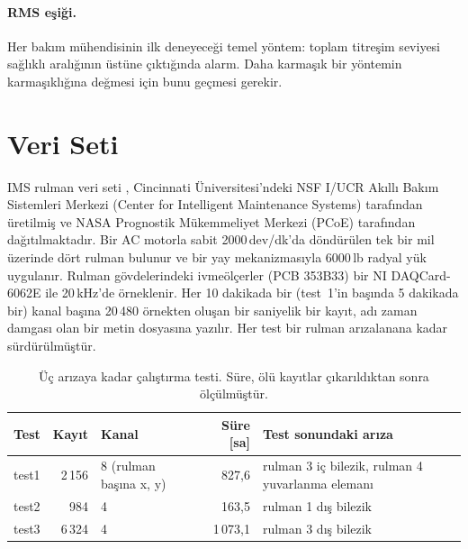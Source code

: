 \documentclass[11pt]{article}
\begin{document}
\paragraph{RMS eşiği.} Her bakım mühendisinin ilk deneyeceği temel yöntem: toplam titreşim seviyesi
sağlıklı aralığının üstüne çıktığında alarm. Daha karmaşık bir yöntemin karmaşıklığına değmesi için
bunu geçmesi gerekir.

\section{Veri Seti}

IMS rulman veri seti \cite{lee2007,qiu2006}, Cincinnati Üniversitesi'ndeki NSF I/UCR Akıllı Bakım
Sistemleri Merkezi (Center for Intelligent Maintenance Systems) tarafından üretilmiş ve NASA Prognostik
Mükemmeliyet Merkezi (PCoE) tarafından dağıtılmaktadır. Bir AC motorla sabit 2000\,dev/dk'da döndürülen
tek bir mil üzerinde dört rulman bulunur ve bir yay mekanizmasıyla 6000\,lb radyal yük uygulanır. Rulman
gövdelerindeki ivmeölçerler (PCB 353B33) bir NI DAQCard-6062E ile 20\,kHz'de örneklenir. Her 10 dakikada
bir (test~1'in başında 5 dakikada bir) kanal başına 20\,480 örnekten oluşan bir saniyelik bir kayıt, adı
zaman damgası olan bir metin dosyasına yazılır. Her test bir rulman arızalanana kadar sürdürülmüştür.

\begin{table}[H]
\centering
\caption{Üç arızaya kadar çalıştırma testi. Süre, ölü kayıtlar çıkarıldıktan sonra ölçülmüştür.}
\label{tab:tests}
\begin{tabularx}{\textwidth}{lrlrX}
\toprule
Test & Kayıt & Kanal & Süre [sa] & Test sonundaki arıza \\
\midrule
test1 & 2\,156 & 8 (rulman başına x, y) & 827,6  & rulman 3 iç bilezik, rulman 4 yuvarlanma elemanı \\
test2 & 984    & 4                      & 163,5  & rulman 1 dış bilezik \\
test3 & 6\,324 & 4                      & 1\,073,1 & rulman 3 dış bilezik \\
\bottomrule
\end{tabularx}
\end{table}
\end{document}
